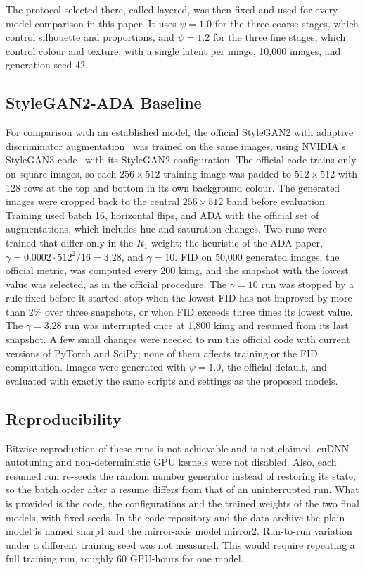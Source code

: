 \documentclass[electronics,article,submit,pdftex,moreauthors]{Definitions/mdpi}
\begin{document}
The protocol selected there, called layered, was then fixed and used for
every model comparison in this paper. It uses $\psi = 1.0$ for the three
coarse stages, which control silhouette and proportions, and $\psi = 1.2$ for
the three fine stages, which control colour and texture, with a single latent
per image, 10,000 images, and generation seed 42.

\subsection{StyleGAN2-ADA Baseline}
\label{subsec:baseline}

For comparison with an established model, the official StyleGAN2 with
adaptive discriminator augmentation~\cite{karras2020stylegan2,karras2020ada}
was trained on the same images, using NVIDIA's StyleGAN3
code~\cite{karras2021aliasfree} with its StyleGAN2 configuration. The official
code trains only on square images, so each $256 \times 512$ training image
was padded to $512 \times 512$ with 128 rows at the top and bottom in its
own background colour. The generated images were cropped back to the
central $256 \times 512$ band before evaluation. Training used batch 16,
horizontal flips, and ADA with the official set of augmentations, which
includes hue and saturation changes. Two runs were trained that differ only
in the $R_1$ weight: the heuristic of the ADA paper,
$\gamma = 0.0002 \cdot 512^2 / 16 = 3.28$, and $\gamma = 10$. FID on 50,000
generated images, the official metric, was computed every 200 kimg, and the
snapshot with the lowest value was selected, as in the official procedure.
The $\gamma = 10$ run was stopped by a rule fixed before it started: stop
when the lowest FID has not improved by more than 2\% over three snapshots,
or when FID exceeds three times its lowest value. The $\gamma = 3.28$ run
was interrupted once at 1,800 kimg and resumed from its last snapshot. A few
small changes were needed to run the official code with current versions of
PyTorch and SciPy; none of them affects training or the FID computation.
Images were generated with $\psi = 1.0$, the official default, and
evaluated with exactly the same scripts and settings as the proposed models.

\subsection{Reproducibility}
\label{subsec:reproducibility}

Bitwise reproduction of these runs is not achievable and is not claimed.
cuDNN autotuning and non-deterministic GPU kernels were not disabled. Also,
each resumed run re-seeds the random number generator instead of restoring
its state, so the batch order after a resume differs from that of an
uninterrupted run.
What is provided is the code, the configurations and the trained weights of
the two final models, with fixed seeds. In the code repository and the data
archive the plain model is named sharp1 and the mirror-axis model mirror2. Run-to-run variation under a
different training seed was not measured. This would require repeating a
full training run, roughly 60 GPU-hours for one model.
\end{document}
